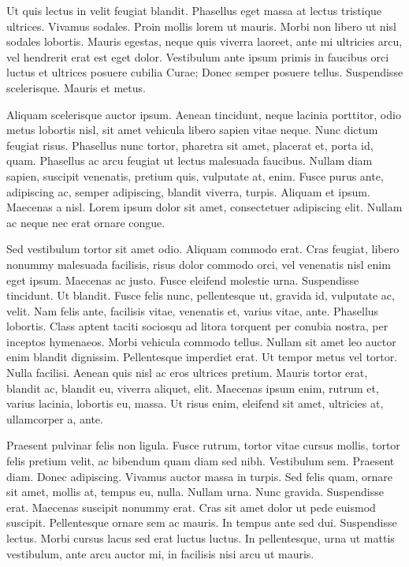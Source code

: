 \documentclass{icldt}
\begin{document}
Ut quis lectus in velit feugiat blandit. Phasellus eget massa at lectus
tristique ultrices. Vivamus sodales. Proin mollis lorem ut mauris. Morbi non
libero ut nisl sodales lobortis. Mauris egestas, neque quis viverra laoreet,
ante mi ultricies arcu, vel hendrerit erat est eget dolor. Vestibulum ante ipsum
primis in faucibus orci luctus et ultrices posuere cubilia Curae; Donec semper
posuere tellus. Suspendisse scelerisque. Mauris et metus.

Aliquam scelerisque auctor ipsum. Aenean tincidunt, neque lacinia porttitor,
odio metus lobortis nisl, sit amet vehicula libero sapien vitae neque. Nunc
dictum feugiat risus. Phasellus nunc tortor, pharetra sit amet, placerat et,
porta id, quam. Phasellus ac arcu feugiat ut lectus malesuada faucibus. Nullam diam
sapien, suscipit venenatis, pretium quis, vulputate at, enim. Fusce purus ante,
adipiscing ac, semper adipiscing, blandit viverra, turpis. Aliquam et ipsum.
Maecenas a nisl. Lorem ipsum dolor sit amet, consectetuer adipiscing elit.
Nullam ac neque nec erat ornare congue.

Sed vestibulum tortor sit amet odio. Aliquam commodo erat. Cras feugiat, libero
nonummy malesuada facilisis, risus dolor commodo orci, vel venenatis nisl enim
eget ipsum. Maecenas ac justo. Fusce eleifend molestie urna. Suspendisse
tincidunt. Ut blandit. Fusce felis nunc, pellentesque ut, gravida id, vulputate
ac, velit. Nam felis ante, facilisis vitae, venenatis et, varius vitae, ante.
Phasellus lobortis. Class aptent taciti sociosqu ad litora torquent per
conubia nostra, per inceptos hymenaeos. Morbi vehicula commodo tellus. Nullam
sit amet leo auctor enim blandit dignissim. Pellentesque imperdiet erat. Ut
tempor metus vel tortor. Nulla facilisi. Aenean quis nisl ac eros ultrices
pretium. Mauris tortor erat, blandit ac, blandit eu, viverra aliquet, elit.
Maecenas ipsum enim, rutrum et, varius lacinia, lobortis eu, massa. Ut risus
enim, eleifend sit amet, ultricies at, ullamcorper a, ante.

Praesent pulvinar felis non ligula. Fusce rutrum, tortor vitae cursus mollis,
tortor felis pretium velit, ac bibendum quam diam sed nibh. Vestibulum sem.
Praesent diam. Donec adipiscing. Vivamus auctor massa in turpis. Sed felis quam,
ornare sit amet, mollis at, tempus eu, nulla. Nullam urna. Nunc gravida.
Suspendisse erat. Maecenas suscipit nonummy erat. Cras sit amet dolor ut pede
euismod suscipit. Pellentesque ornare sem ac mauris. In tempus ante sed dui.
Suspendisse lectus. Morbi cursus lacus sed erat luctus luctus. In pellentesque,
urna ut mattis vestibulum, ante arcu auctor mi, in facilisis nisi arcu ut
mauris.
\end{document}
